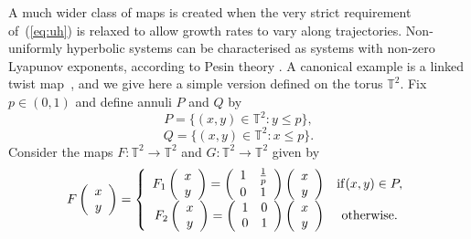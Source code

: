 \documentclass{iopart}
\begin{document}
A much wider class of maps is created when the very strict requirement of~(\ref{eq:uh}) is relaxed to allow growth rates to vary along trajectories. Non-uniformly hyperbolic systems can be characterised as systems with non-zero Lyapunov exponents, according to Pesin theory \cite{pesin1977characteristic}. A canonical example is a linked twist map~\cite{devaney1978subshifts,burton1980ergodicity,wojtkowski1980linked,przytycki1983ergodicity}, and we give here a simple version defined on the torus $\mathbb{T}^2$. Fix $p \in (0,1)$ and define annuli $P$ and $Q$ by
$$ P = \{ (x,y) \in \mathbb{T}^2 : y \le p \},$$
$$ Q = \{ (x,y) \in \mathbb{T}^2 : x \le p \}.$$
Consider the maps $F: \mathbb{T}^2 \rightarrow \mathbb{T}^2$ and $G: \mathbb{T}^2 \rightarrow \mathbb{T}^2$ given by
\begin{equation}
\label{ltmboundsF}
F \left( \begin{array}{c} x\\ y \end{array} \right) = \left\{
\begin{array}{r@{\quad}cr}
F_1 \left( \begin{array}{c} x\\ y \end{array} \right)= \left( \begin{array}{cc} 1 & \frac{1}{p} \\ 0 & 1 \end{array} \right) \left( \begin{array}{c} x\\ y \end{array} \right) & \mathrm{ if } (x,y) \in P,\\
F_2 \left( \begin{array}{c} x\\ y \end{array} \right)= \left( \begin{array}{cc} 1 & 0 \\ 0 & 1 \end{array} \right) \left( \begin{array}{c} x\\ y \end{array} \right) & \mathrm{ otherwise}.
\end{array}\right.
\end{equation}
\end{document}
